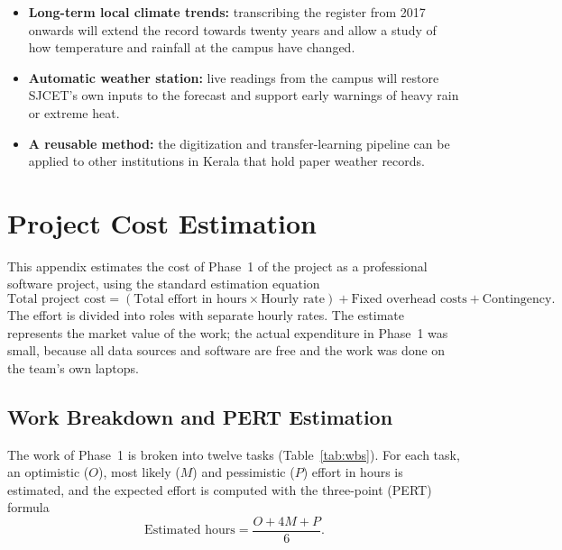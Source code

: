 \begin{itemize}
    \item \textbf{Long-term local climate trends:} transcribing the register from 2017 onwards will extend the record towards twenty years and allow a study of how temperature and rainfall at the campus have changed.
    \item \textbf{Automatic weather station:} live readings from the campus will restore SJCET's own inputs to the forecast and support early warnings of heavy rain or extreme heat.
    \item \textbf{A reusable method:} the digitization and transfer-learning pipeline can be applied to other institutions in Kerala that hold paper weather records.
\end{itemize}

\chapter{Project Cost Estimation}
\label{app:cost}

This appendix estimates the cost of Phase~1 of the project as a professional software project, using the standard estimation equation
\[
\text{Total project cost}=(\text{Total effort in hours}\times\text{Hourly rate})+\text{Fixed overhead costs}+\text{Contingency}.
\]
The effort is divided into roles with separate hourly rates. The estimate represents the market value of the work; the actual expenditure in Phase~1 was small, because all data sources and software are free and the work was done on the team's own laptops.

\section{Work Breakdown and PERT Estimation}
\label{app:cost-wbs}

The work of Phase~1 is broken into twelve tasks (Table~\ref{tab:wbs}). For each task, an optimistic ($O$), most likely ($M$) and pessimistic ($P$) effort in hours is estimated, and the expected effort is computed with the three-point (PERT) formula
\[
\text{Estimated hours}=\frac{O+4M+P}{6}.
\]

